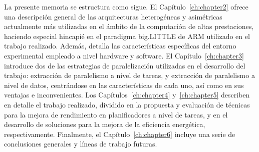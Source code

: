 La presente memoria se estructura como sigue. 
El Capítulo~\ref{ch:chapter2} ofrece una descripción general de las
arquitecturas heterogéneas y asimétricas actualmente más utilizadas en el
ámbito de la computación de altas prestaciones, haciendo especial hincapié
en el paradigma big.LITTLE de ARM utilizado en el trabajo
realizado. Además, detalla las características específicas del entorno
experimental empleado a nivel hardware y software.
El Capítulo~\ref{ch:chapter3} introduce dos de las estrategias de
paralelización utilizadas en el desarrollo del trabajo: extracción de
paralelismo a nivel de tareas, y extracción de paralelismo a nivel de
datos, centrándose en las características de cada uno, así como en sus
ventajas e inconvenientes.
Los Capítulos~\ref{ch:chapter4} y~\ref{ch:chapter5} describen en detalle el
trabajo realizado, dividido en la propuesta y evaluación de técnicas para
la mejora de rendimiento en planificadores a nivel de tareas, y en el
desarrollo de soluciones para la mejora de la eficiencia energética,
respectivamente.
Finalmente, el Capítulo~\ref{ch:chapter6} incluye una serie de conclusiones
generales y líneas de trabajo futuras.


